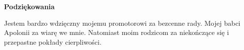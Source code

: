 \newpage
    \begin{center}
	{\large\bfseries Podziękowania}\par\bigskip\end{center}
Jestem bardzo wdzięczny	mojemu promotorowi za bezcenne rady.
Mojej babci Apolonii za wiarę we mnie.
Natomiast moim rodzicom za niekończące się i przepastne pokłady cierpliwości.
